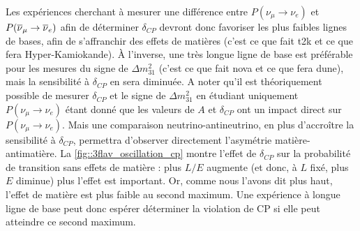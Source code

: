       Les expériences cherchant à mesurer une différence entre $P(\nu_{\mu}\to\nu_e)$ et $P(\overline{\nu}_{\mu}\to\overline{\nu}_e)$ afin de déterminer $\delta_{CP}$ devront donc favoriser les plus faibles lignes de bases, afin de s'affranchir des effets de matières (c'est ce que fait \gls{t2k} et ce que fera Hyper-Kamiokande). À l'inverse, une très longue ligne de base est préférable pour les mesures du signe de $\Delta m^2_{31}$ (c'est ce que fait \gls{nova} et ce que fera \gls{dune}), mais la sensibilité à $\delta_{CP}$ en sera diminuée. A noter qu'il est théoriquement possible de mesurer $\delta_{CP}$ et le signe de $\Delta m^2_{31}$ en étudiant uniquement $P(\nu_{\mu}\to\nu_e)$ étant donné que les valeurs de $A$ et $\delta_{CP}$ ont un impact direct sur $P(\nu_{\mu}\to\nu_e)$. Mais une comparaison neutrino-antineutrino, en plus d'accroître la sensibilité à $\delta_{CP}$, permettra d'observer directement l'asymétrie matière-antimatière. La \autoref{fig::3flav_oscillation_cp} montre l'effet de $\delta_{CP}$ sur la probabilité de transition sans effets de matière : plus $L/E$ augmente (et donc, à $L$ fixé, plus $E$ diminue) plus l'effet est important. Or, comme nous l'avons dit plus haut, l'effet de matière est plus faible au second maximum. Une expérience à longue ligne de base peut donc espérer déterminer la violation de CP si elle peut atteindre ce second maximum.

